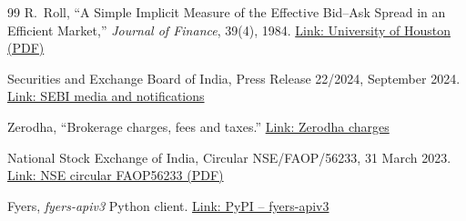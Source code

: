 \documentclass[10pt,a4paper]{article}
\begin{document}
\begin{thebibliography}{99}
 R.~Roll, ``A Simple Implicit Measure of the Effective Bid--Ask
Spread in an Efficient Market,'' \emph{Journal of Finance}, 39(4), 1984.
\href{https://www.bauer.uh.edu/rsusmel/phd/roll1984.pdf}{Link: University of Houston (PDF)}

 Securities and Exchange Board of India, Press Release 22/2024,
September 2024.
\href{https://www.sebi.gov.in/media-and-notifications/press-releases/sep-2024/updated-sebi-study-reveals-93-of-individual-traders-incurred-losses-in-equity-fando-between-fy22-and-fy24-aggregate-losses-exceed-1-8-lakh-crores-over-three-years_86906.html}{Link: SEBI media and notifications}

 Zerodha, ``Brokerage charges, fees and taxes.''
\href{https://zerodha.com/charges/}{Link: Zerodha charges}

 National Stock Exchange of India, Circular
NSE/FAOP/56233, 31 March 2023.
\href{https://archives.nseindia.com/content/circulars/FAOP56233.pdf}{Link: NSE circular FAOP56233 (PDF)}

 Fyers, \emph{fyers-apiv3} Python client.
\href{https://pypi.org/project/fyers-apiv3/}{Link: PyPI -- fyers-apiv3}

\end{thebibliography}
\end{document}
